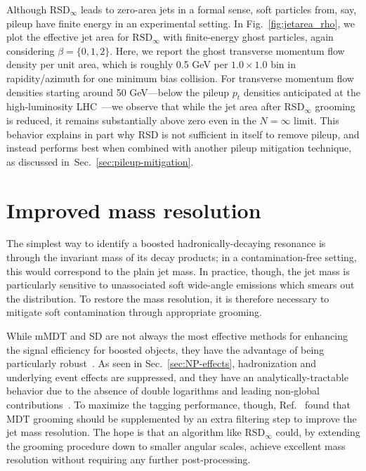 \documentclass[11pt,a4paper]{article}
\newcommand{\RSDinf}{\text{RSD}_\infty}
\DeclareRobustCommand{\Sec}[1]{Sec.~\ref{#1}}
\DeclareRobustCommand{\Fig}[1]{Fig.~\ref{#1}}
\DeclareRobustCommand{\Ref}[1]{Ref.~\cite{#1}}
\begin{document}
Although RSD$_\infty$ leads to zero-area jets in a formal sense, soft
particles from, say, pileup have finite energy in an experimental
setting.
%
In \Fig{fig:jetarea_rho}, we plot the effective jet area for $\RSDinf$
with finite-energy ghost particles, again considering
$\beta = \{0,1,2\}$.
%
Here, we report the ghost transverse momentum flow density per unit
area, which is roughly 0.5 GeV per $1.0\times1.0$ bin in
rapidity/azimuth for one minimum bias collision.
%
For transverse momentum flow densities starting around 50 GeV---below the pileup $p_t$ densities anticipated at the
high-luminosity LHC~\cite{Aad:2015ina}---we observe that while the
jet area after RSD$_\infty$ grooming is reduced, it remains
substantially above zero even in the $N=\infty$ limit.
%
This behavior explains in part why RSD is not sufficient in itself to remove pileup, and instead performs best when combined
with another pileup mitigation technique, as discussed in~\Sec{sec:pileup-mitigation}.



\section{Improved mass resolution}
\label{sec:mass-resol}

The simplest way to identify a boosted hadronically-decaying resonance is through the invariant mass of its decay
products; in a contamination-free setting, this would correspond to the plain jet mass.
%
In practice, though, the jet mass is particularly sensitive to
unassociated soft wide-angle emissions which smears out the
distribution.
%
To restore the mass resolution, it is therefore necessary to mitigate soft contamination through appropriate grooming.

While mMDT and SD are not always the most effective methods
for enhancing the signal efficiency for boosted objects, they have the advantage of being
particularly robust~\cite{Dasgupta:2016ktv}.
%
As seen in \Sec{sec:NP-effects}, hadronization and underlying event
effects are suppressed, and they have an analytically-tractable
behavior due to the absence of double logarithms and leading
non-global
contributions~\cite{Dasgupta:2001sh,Dasgupta:2002bw,Dasgupta:2013ihk}.
%
To maximize the tagging performance, though, \Ref{Butterworth:2008iy} found that MDT grooming should be supplemented by an extra filtering step to improve the jet mass resolution.
%
The hope is that an algorithm like RSD$_\infty$ could, by extending
the grooming procedure down to smaller angular scales, achieve
excellent mass resolution without requiring any further
post-processing.
\end{document}
